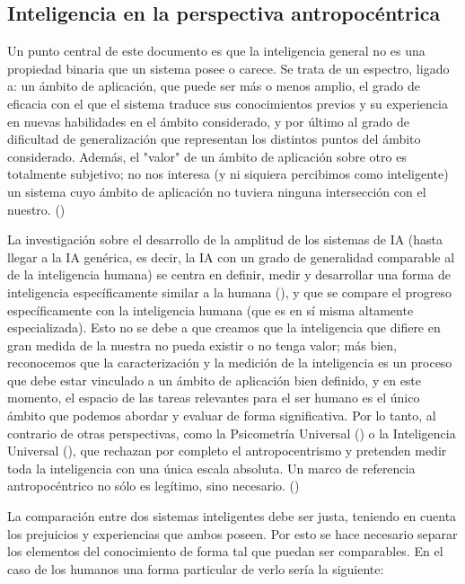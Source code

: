 \subsection{Inteligencia en la perspectiva antropocéntrica}

Un punto central de este documento es que la inteligencia general no es una propiedad binaria que un sistema posee o carece. Se trata de un espectro, ligado a: un ámbito de aplicación, que puede ser más o menos amplio, el grado de eficacia con el que el sistema traduce sus conocimientos previos y su experiencia en nuevas habilidades en el ámbito considerado, y por último al grado de dificultad de generalización que representan los distintos puntos del ámbito considerado. Además, el "valor" de un ámbito de aplicación sobre otro es totalmente subjetivo; no nos interesa (y ni siquiera percibimos como inteligente) un sistema cuyo ámbito de aplicación no tuviera ninguna intersección con el nuestro. (\cite{chollet2019measure})

La investigación sobre el desarrollo de la amplitud de los sistemas de IA (hasta llegar a la IA genérica, es decir, la IA con un grado de generalidad comparable al de la inteligencia humana) se centra en definir, medir y desarrollar una forma de inteligencia específicamente similar a la humana (\cite{goertzel2012architecture}), y que se compare el progreso específicamente con la inteligencia humana (que es en sí misma altamente especializada). Esto no se debe a que creamos que la inteligencia que difiere en gran medida de la nuestra no pueda existir o no tenga valor; más bien, reconocemos que la caracterización y la medición de la inteligencia es un proceso que debe estar vinculado a un ámbito de aplicación bien definido, y en este momento, el espacio de las tareas relevantes para el ser humano es el único ámbito que podemos abordar y evaluar de forma significativa. Por lo tanto, al contrario de otras perspectivas, como la Psicometría Universal (\cite{hernandez2014universal}) o la Inteligencia Universal (\cite{legg2007universal}), que rechazan por completo el antropocentrismo y pretenden medir toda la inteligencia con una única escala absoluta. Un marco de referencia antropocéntrico no sólo es legítimo, sino necesario. (\cite{chollet2019measure})

La comparación entre dos sistemas inteligentes debe ser justa, teniendo en cuenta los prejuicios y experiencias que ambos poseen. Por esto se hace necesario separar los elementos del conocimiento de forma tal que puedan ser comparables. En el caso de los humanos una forma particular de verlo sería la siguiente:

